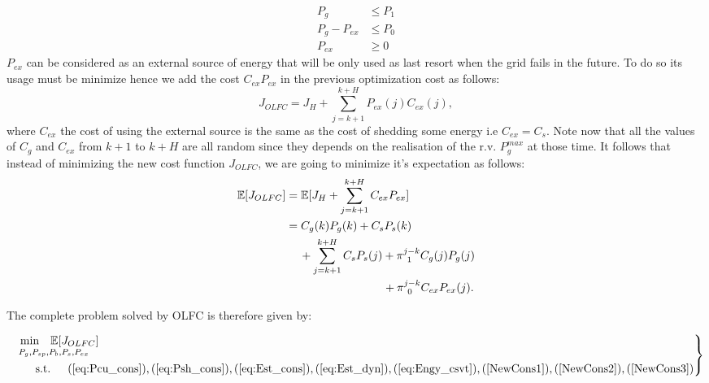 \documentclass{ifacconf}
\begin{document}
 \begin{align}
 P_g &\leq P_1 \label{NewCons1}\\
 P_g - P_{ex} & \leq P_0 \label{NewCons2}\\
 P_{ex} & \geq \label{NewCons3}0 
 \end{align}
$P_{ex}$ can be considered as an external source of energy that will be  only used as last resort when the grid fails in the future. To do so its usage must be minimize hence we add the cost $C_{ex}P_{ex}$ in the previous optimization cost as follows: 
\begin{equation}
    J_{OLFC} = J_H + \sum_{j=k+1}^{k+H} P_{ex}(j)C_{ex}(j),
\end{equation}
where $C_{ex}$ the cost of using the external source is the same as the cost of shedding some energy i.e $C_{ex} = C_s$. Note  now that all the values of $C_g$ and $C_{ex}$ from $k+1$ to $k+H$ are all random since they depends on the realisation of the r.v. $P_{g}^{max}$ at those time. It follows that instead of minimizing the new cost function $J_{OLFC}$, we are going to minimize it's expectation as follows:
\begin{equation}
    \begin{split}
        \mathbb{E}[J_{OLFC}] &= \mathbb{E}[J_H + \sum_{j=k+1}^{k+H}C_{ex}P_{ex}] \\
                             &=  C_g(k)P_g(k) + C_sP_s(k) \\
                             &\hspace{12px}+\sum_{j=k+1}^{k+H}  C_sP_s(j) + \pi_{\;\,1}^{j-k}C_g(j)P_g(j)\\
                             &\hspace{85px} + \pi_{\;\,0}^{j-k}C_{ex}P_{ex}(j). 
    \end{split}
\end{equation}

The complete problem solved by OLFC is therefore given by: 

\begin{equation}\label{eq:OLFCsys}
\left. 
\begin{aligned}
&\underset{P_g,P_{sp},P_b,P_s,P_{ex}}{\hspace{10px} \text{min} \hspace{10px}\mathbb{E}[J_{OLFC}]}\\
& \text{\hspace{20px} s.t.\hspace{15px}}(\ref{eq:Pcu_cons}),(\ref{eq:Psh_cons}),(\ref{eq:Est_cons}),(\ref{eq:Est_dyn}),(\ref{eq:Engy_csvt}),(\ref{NewCons1}),(\ref{NewCons2}),(\ref{NewCons3})
\end{aligned}\right \}
\end{equation}
\end{document}
